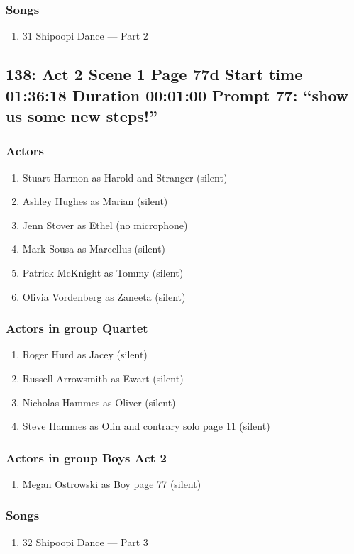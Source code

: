 \subsubsection{Songs}
\begin{enumerate}
\item 31 Shipoopi Dance --- Part 2
\end{enumerate}
\subsection{138: Act 2 Scene 1 Page 77d Start time 01:36:18 Duration 00:01:00 Prompt 77: ``show us some new steps!''}

\subsubsection{Actors}
\begin{enumerate}
\item Stuart Harmon as Harold and Stranger (silent)
\item Ashley Hughes as Marian (silent)
\item Jenn Stover as Ethel (no microphone)
\item Mark Sousa as Marcellus (silent)
\item Patrick McKnight as Tommy (silent)
\item Olivia Vordenberg as Zaneeta (silent)
\end{enumerate}
\subsubsection{Actors in group Quartet}
\begin{enumerate}
\item Roger Hurd as Jacey (silent)
\item Russell Arrowsmith as Ewart (silent)
\item Nicholas Hammes as Oliver (silent)
\item Steve Hammes as Olin and contrary solo page 11 (silent)
\end{enumerate}
\subsubsection{Actors in group Boys Act 2}
\begin{enumerate}
\item Megan Ostrowski as Boy page 77 (silent)
\end{enumerate}

\subsubsection{Songs}
\begin{enumerate}
\item 32 Shipoopi Dance --- Part 3
\end{enumerate}
